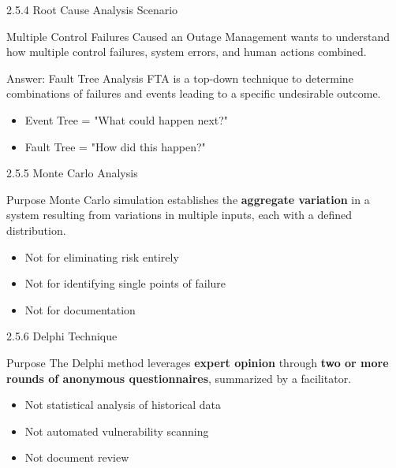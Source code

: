 \documentclass{beamer}
\begin{document}
	\begin{frame}{2.5.4 Root Cause Analysis Scenario}
		\begin{block}{Multiple Control Failures Caused an Outage}
			Management wants to understand how multiple control failures, system errors, and human actions combined.
		\end{block}
		\begin{exampleblock}{Answer: Fault Tree Analysis}
			FTA is a top-down technique to determine combinations of failures and events leading to a specific undesirable outcome.
		\end{exampleblock}
		\begin{itemize}
			\item Event Tree = "What could happen next?"
			\item Fault Tree = "How did this happen?"
		\end{itemize}
	\end{frame}
	
	\begin{frame}{2.5.5 Monte Carlo Analysis}
		\begin{block}{Purpose}
			Monte Carlo simulation establishes the \textbf{aggregate variation} in a system resulting from variations in multiple inputs, each with a defined distribution.
		\end{block}
		\begin{itemize}
			\item Not for eliminating risk entirely
			\item Not for identifying single points of failure
			\item Not for documentation
		\end{itemize}
	\end{frame}
	
	\begin{frame}{2.5.6 Delphi Technique}
		\begin{block}{Purpose}
			The Delphi method leverages \textbf{expert opinion} through \textbf{two or more rounds of anonymous questionnaires}, summarized by a facilitator.
		\end{block}
		\begin{itemize}
			\item Not statistical analysis of historical data
			\item Not automated vulnerability scanning
			\item Not document review
		\end{itemize}
	\end{frame}
	
\end{document}
